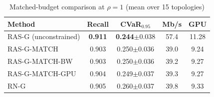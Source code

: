 \begin{table}[t]
\caption{Matched-budget comparison at $\rho=1$ (mean over 15 topologies)}
\label{tab:matched}
\centering\footnotesize
\setlength{\tabcolsep}{3.5pt}
\begin{tabular}{@{}lcccc@{}}
\toprule
Method & Recall & CVaR$_{0.95}$ & Mb/s & GPU \\ \midrule
RAS-G (unconstrained) & \textbf{0.911} & \textbf{0.244}$\pm$0.038 & 57.4 & 11.28 \\
RAS-G-MATCH & 0.903 & 0.250$\pm$0.036 & 39.0 & 9.24 \\
RAS-G-MATCH-BW & 0.903 & 0.250$\pm$0.036 & 39.2 & 9.27 \\
RAS-G-MATCH-GPU & 0.904 & 0.249$\pm$0.037 & 39.3 & 9.27 \\
RN-G & 0.905 & 0.260$\pm$0.037 & 39.8 & 9.33 \\
\bottomrule
\end{tabular}
\end{table}
